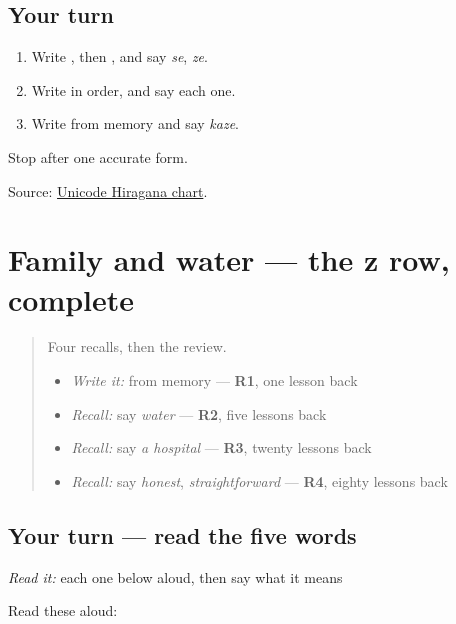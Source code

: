 \subsection*{Your turn}
\begin{enumerate}
\raggedright
  \item Write \textbf{}, then \textbf{}, and say \emph{se}, \emph{ze}.
  \item Write \textbf{    } in order, and say each one.
  \item Write \textbf{} from memory and say \emph{kaze}.
\end{enumerate}

\begin{tcolorbox}[breakable,colback=teal!4,colframe=teal!35!black,title={Before you move on}]
Stop after one accurate form.

Source: \href{https://www.unicode.org/charts/PDF/U3040.pdf}{Unicode Hiragana chart}.
\end{tcolorbox}
\section[(dialogue)]{Family and water — the z row, complete}

\label{lesson:JA-R136-family-and-water}



\begin{quote}
Four recalls, then the review.

\begin{itemize}
\raggedright
  \item \emph{Write it:} \textbf{} from memory — \textbf{R1}, one lesson back
  \item \emph{Recall:} say \emph{water} — \textbf{R2}, five lessons back
  \item \emph{Recall:} say \emph{a hospital} — \textbf{R3}, twenty lessons back
  \item \emph{Recall:} say \emph{honest}, \emph{straightforward} — \textbf{R4}, eighty lessons back
\end{itemize}
\end{quote}

\subsection*{Your turn — read the five words}
\emph{Read it:} each one below aloud, then say what it means

Read these aloud:

